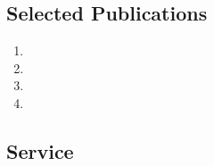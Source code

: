 \documentclass{article}
\begin{document}
\subsection*{Selected Publications}

\begin{enumerate}
\item {}
\item {}
\item {}
\item {}
\end{enumerate}


%


%


\subsection*{Service}



%



%
\end{document}
